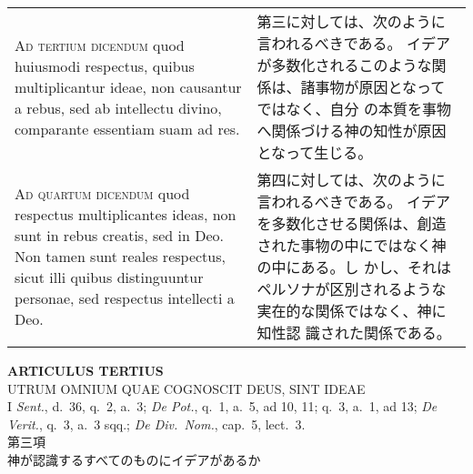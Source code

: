 \documentclass[10pt]{jsarticle} %
\begin{document}
\begin{longtable}{p{21em}p{21em}}
\\


{\scshape Ad tertium dicendum} quod huiusmodi respectus,
quibus multiplicantur ideae, non causantur a rebus, sed ab intellectu
divino, comparante essentiam suam ad res.

&

第三に対しては、次のように言われるべきである。
イデアが多数化されるこのような関係は、諸事物が原因となってではなく、自分
 の本質を事物へ関係づける神の知性が原因となって生じる。

\\

{\scshape Ad quartum dicendum} quod respectus
multiplicantes ideas, non sunt in rebus creatis, sed in Deo. Non tamen
sunt reales respectus, sicut illi quibus distinguuntur personae, sed
respectus intellecti a Deo.

&

第四に対しては、次のように言われるべきである。
イデアを多数化させる関係は、創造された事物の中にではなく神の中にある。し
 かし、それはペルソナが区別されるような実在的な関係ではなく、神に知性認
 識された関係である。


\end{longtable}
\newpage


\begin{center}
 {\Large {\bf ARTICULUS TERTIUS}}\\
 {\large UTRUM OMNIUM QUAE COGNOSCIT DEUS, SINT IDEAE}\\
 {\footnotesize I {\itshape Sent.}, d.~36, q.~2, a.~3; {\itshape De
 Pot.}, q.~1, a.~5, ad 10, 11; q.~3, a.~1, ad 13; {\itshape De Verit.},
 q.~3, a.~3 sqq.; {\itshape De Div.~Nom.}, cap.~5, lect.~3.}\\
 {\Large 第三項\\神が認識するすべてのものにイデアがあるか}
\end{center}
\end{document}
